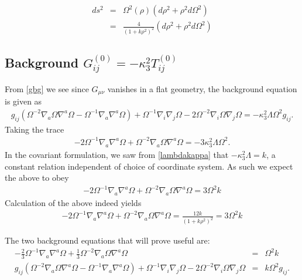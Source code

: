 \documentclass[10pt,letterpaper]{article}
\numberwithin{equation}{section}
\begin{document}
\begin{eqnarray}
ds^2 &=& \Omega^2(\rho)\left( d\rho^2 + \rho^2 d\Omega^2\right)
\nonumber\\
&=& \frac{4}{\left(1+k \rho^2\right)^2}\left( d\rho^2 + \rho^2 d\Omega^2\right)
\label{cfbg}
\end{eqnarray}
\subsection{Background $G^{(0)}_{ij} = -\kappa^2_3 T_{ij}^{(0)}$}
From \eqref{gbg} we see since $G_{\mu\nu}$ vanishes in a flat geometry, the background equation is given as
\begin{eqnarray}
 g_{ij}( \Omega^{-2} \nabla_{a}\Omega \nabla^{a}\Omega -\Omega^{-1} \nabla_{a}\nabla^{a}\Omega)+  \Omega^{-1} \nabla_{i}\nabla_{j}\Omega - 2 \Omega^{-2} \nabla_{i}\Omega \nabla_{j}\Omega 
= -\kappa_3^2 \Lambda \Omega^2 g_{ij}. 
\label{dgtbg}
\end{eqnarray}
Taking the trace
\begin{eqnarray}
-2\Omega^{-1} \nabla_a\nabla^a \Omega + \Omega^{-2} \nabla_a\Omega \nabla^a\Omega = -3\kappa_3^2 \Lambda \Omega^2.
\end{eqnarray}
In the covariant formulation, we saw from \eqref{lambdakappa} that $-\kappa^2_3\Lambda = k$, a constant relation independent of choice of coordinate system. As such we expect the above to obey
\begin{eqnarray}
-2\Omega^{-1} \nabla_a\nabla^a \Omega + \Omega^{-2} \nabla_a\Omega \nabla^a\Omega = 3\Omega^2 k
\end{eqnarray}
Calculation of the above indeed yields
\begin{eqnarray}
-2\Omega^{-1} \nabla_a\nabla^a \Omega + \Omega^{-2} \nabla_a\Omega \nabla^a\Omega = \frac{12k}{(1+k\rho^2)^2} = 3\Omega^2 k
\end{eqnarray}

The two background equations that will prove useful are:
\begin{eqnarray}
-\tfrac{2}{3} \Omega^{-1}\nabla_a \nabla^a \Omega + \tfrac{1}{3}\Omega^{-2}\nabla_a\Omega \nabla^a\Omega &=& \Omega^2 k
\label{bg1}
\\
g_{ij}( \Omega^{-2} \nabla_{a}\Omega \nabla^{a}\Omega -\Omega^{-1} \nabla_{a}\nabla^{a}\Omega)+  \Omega^{-1} \nabla_{i}\nabla_{j}\Omega - 2 \Omega^{-2} \nabla_{i}\Omega \nabla_{j}\Omega 
&=& k \Omega^2 g_{ij}.
\label{bg2}
\end{eqnarray}


\end{document}

